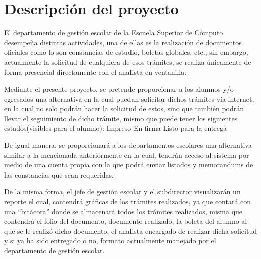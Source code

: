 \section{Descripción del proyecto}
El departamento de gestión escolar de la Escuela Superior de Cómputo desempeña distintas actividades, una de ellas es la realización de documentos oficiales como lo son constancias de estudio, boletas globales, etc., sin embargo, actualmente la solicitud de cualquiera de esos trámites, se realiza únicamente de forma presencial directamente con el analista en ventanilla.

Mediante el presente proyecto, se pretende proporcionar a los alumnos y/o egresados una alternativa en la cual puedan solicitar dichos trámites vía internet, en la cual no solo podrán hacer la solicitud de estos, sino que también podrán llevar el seguimiento de dicho trámite, mismo que puede tener los siguientes estados(visibles para el alumno):
Impreso
En firma 
Listo para la entrega

De igual manera,  se proporcionará a los departamentos escolares una alternativa similar a la mencionada anteriormente en la cual, tendrán acceso al sistema por medio de una cuenta propia con la que podrá enviar listados y memorandums de las constancias que sean requeridas.

De la misma forma, el jefe de gestión escolar y el subdirector visualizarán un reporte el cual, contendrá gráficas de los trámites realizados, ya que contará con una “bitácora” donde se almacenará todos los trámites realizados, misma que contendrá el folio del documento, documento realizado, la boleta del alumno al que se le realizó dicho documento, el analista encargado de realizar dicha solicitud y si ya ha sido entregado o no, formato actualmente manejado por el departamento de gestión escolar.
